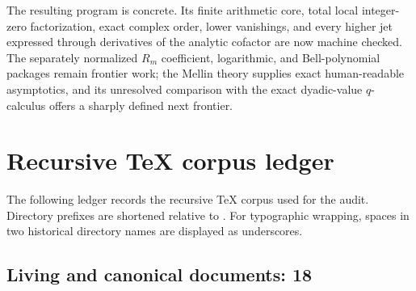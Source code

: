 \documentclass[11pt]{article}
\numberwithin{equation}{section}
\theoremstyle{definition}
\theoremstyle{remark}
\begin{document}
The resulting program is concrete.  Its finite arithmetic core, total local
integer-zero factorization, exact complex order, lower vanishings, and every
higher jet expressed through derivatives of the analytic cofactor are now
machine checked.  The separately normalized \(R_m\) coefficient, logarithmic,
and Bell-polynomial packages remain frontier work; the
Mellin theory supplies exact human-readable asymptotics, and its unresolved
comparison with the exact dyadic-value $q$-calculus offers a sharply defined
next frontier.

\appendix
\renewcommand*{\theHsection}{\arabic{part}.\arabic{section}}
\clearpage
\begingroup
\small
\setlength{\tabcolsep}{5pt}
\sloppy
\section{Recursive TeX corpus ledger}\label{p7:app:ledger}

The following ledger records the recursive TeX corpus used for the audit.  Directory prefixes are shortened relative to
.  For typographic wrapping, spaces in two historical directory names are displayed as underscores.

\subsection{Living and canonical documents: 18}
\end{document}
